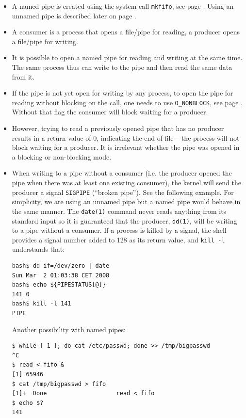 \label{NAMEDPIPE}

\begin{itemize}
\item A named pipe is created using the system call \texttt{mkfifo}, see page
\pageref{MKFIFO}.  Using an unnamed pipe is described later on page
\pageref{PIPE}.
\item A consumer is a process that opens a file/pipe for reading, a producer
opens a file/pipe for writing. 
\item It is possible to open a named pipe for reading and writing at the same
time.  The same process thus can write to the pipe and then read the same data
from it.
\item If the pipe is not yet open for writing by any process, to open the pipe
for reading without blocking on the call, one needs to use \texttt{O\_NONBLOCK},
see page \pageref{O_NONBLOCK}.  Without that flag the consumer will block
waiting for a producer.
\item However, trying to read a previously opened pipe that has no producer
results in a return value of 0, indicating the end of file -- the process will
not block waiting for a producer.  It is irrelevant whether the pipe was opened
in a blocking or non-blocking mode.
\item When writing to a pipe without a consumer (i.e. the producer opened the
pipe when there was at least one existing consumer), the kernel will send the
producer a signal \texttt{SIGPIPE} (``broken pipe'').  See the following
example.  For simplicity, we are using an unnamed pipe but a named pipe
would behave in the same manner.  The \texttt{date(1)} command never
reads anything from its standard input so it is guaranteed that the producer,
\texttt{dd(1)}, will be writing to a pipe without a consumer.  If a process is
killed by a signal, the shell provides a signal number added to 128 as its
return value, and \texttt{kill -l} understands that:

\begin{verbatim}
bash$ dd if=/dev/zero | date
Sun Mar  2 01:03:38 CET 2008
bash$ echo ${PIPESTATUS[@]}
141 0
bash$ kill -l 141
PIPE
\end{verbatim}

Another possibility with named pipes:

\begin{verbatim}
$ while [ 1 ]; do cat /etc/passwd; done >> /tmp/bigpasswd
^C
$ read < fifo &
[1] 65946
$ cat /tmp/bigpasswd > fifo
[1]+  Done                    read < fifo
$ echo $?
141
\end{verbatim}


\end{itemize}
